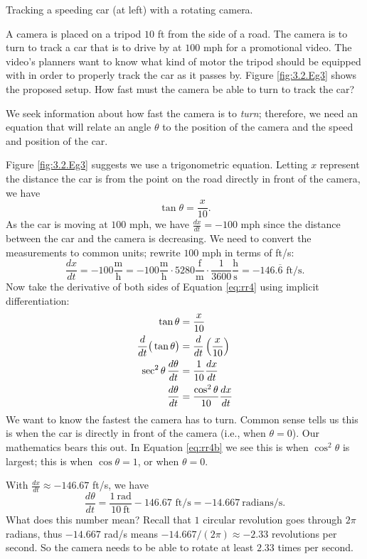 \begin{marginfigure}[8cm]
\caption{Tracking a speeding car (at left) with a rotating camera.}\label{fig:3.2.Eg3}
\end{marginfigure}

\begin{example} \label{Ex:3.2.Eg3}
A camera is placed on a tripod $10$ ft from the side of a road. The camera is to turn to track a car that is to drive by at $100$ mph for a promotional video. The video's planners want to know what kind of motor the tripod should be equipped with in order to properly track the car as it passes by.  Figure \ref{fig:3.2.Eg3} shows the proposed setup.
How fast must the camera be able to turn to track the car?

\solution We seek information about how fast the camera is to \textit{turn}; therefore, we need an equation that will relate an angle $\theta$ to the position of the camera and the speed and position of the car.

Figure \ref{fig:3.2.Eg3} suggests we use a trigonometric equation. Letting $x$ represent the distance the car is from the point on the road directly in front of the camera, we have 
\begin{equation}\tan \theta = \frac{x}{10}.\label{eq:rr4}\end{equation} 
As the car is moving at $100$ mph, we have $\frac{dx}{dt} = -100$ mph since the distance between the car and the camera is decreasing. We need to convert the measurements to common units; rewrite $100$ mph in terms of ft/s:
$$\frac{dx}{dt} = -100\frac{\text{m}}{\text{h}} = -100\frac{\text{m}}{\text{h}}\cdot5280\frac{\text{f}}{\text{m}}\cdot\frac{1}{3600}\frac{\text{h}}{\text{s}} =-146.\overline{6}\text{ ft/s}.$$
Now take the derivative of both sides of Equation \eqref{eq:rr4} using implicit differentiation:
\begin{align}
		\tan \theta &= \frac{x}{10} \notag \\
		\frac{d}{dt}\big(\tan \theta\big) &= \frac{d}{dt}\left(\frac{x}{10}\right)\notag \\
		\sec^2\theta\,\frac{d\theta}{dt} &= \frac{1}{10}\frac{dx}{dt}\notag\\
		\frac{d\theta}{dt} &= \frac{\cos^2\theta}{10}\frac{dx}{dt}\label{eq:rr4b}
\end{align}
We want to know the fastest the camera has to turn. Common sense tells us this is when the car is directly in front of the camera (i.e., when $\theta = 0$). Our mathematics bears this out. In Equation \eqref{eq:rr4b} we see this is when $\cos^2\theta$ is largest; this is when $\cos \theta = 1$, or when $\theta = 0$.

With $\frac{dx}{dt} \approx -146.67$ ft/s, we have 
	$$\frac{d\theta}{dt} = \frac{1 \ \text{rad}}{10 \ \text{ft}}-146.67\text{ ft/s} = -14.667 \ \text{radians/s}.$$
What does this number mean? Recall that $1$ circular revolution goes through $2\pi$ radians, thus $-14.667$ rad/s means $-14.667/(2\pi)\approx -2.33$ revolutions per second.  So the camera needs to be able to rotate at least $2.33$ times per second.

\end{example}